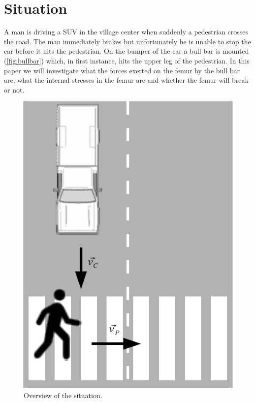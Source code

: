 \section{Situation}
\label{sec:intro}
A man is driving a SUV in the village center when suddenly a pedestrian crosses
the road. The man immediately brakes but unfortunately he is unable to stop the
car before it hits the pedestrian. On the bumper of the car a bull bar is
mounted (\autoref{fig:bullbar}) which, in first instance, hits the upper leg of
the pedestrian. In this paper we will investigate what the forces exerted on the
femur by the bull bar are, what the internal stresses in the femur are and
whether the femur will break or not.

\begin{figure}[htp]
\begin{center}
  \includegraphics{img/situation.pdf}
  \caption{Overview of the situation.}
  \label{fig:situation}
\end{center}
\end{figure}

